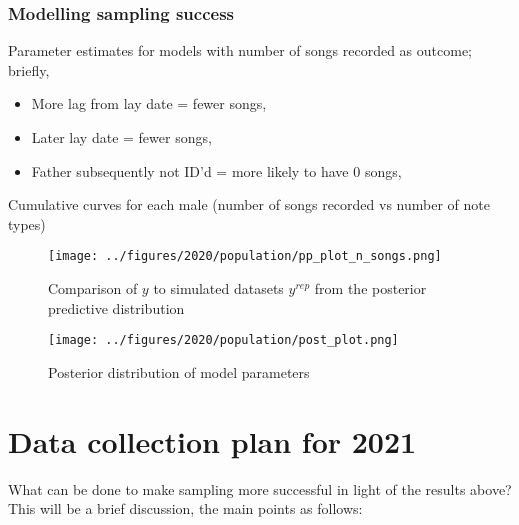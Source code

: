 \documentclass[]{report}
\begin{document}
\hypertarget{modelling-sampling-success}{%
\subsection{Modelling sampling
success}\label{modelling-sampling-success}}

Parameter estimates for models with number of songs recorded as outcome;
briefly,

\begin{itemize}
\item
  More lag from lay date = fewer songs,
\item
  Later lay date = fewer songs,
\item
  Father subsequently not ID'd = more likely to have 0 songs,
\end{itemize}

Cumulative curves for each male (number of songs recorded vs number of
note types)

\begin{figure}
\centering
\texttt{[image: ../figures/2020/population/pp\_plot\_n\_songs.png]}
\caption{Comparison of \(y\) to simulated datasets \(y^{rep}\) from the
posterior predictive distribution}
\end{figure}

\begin{figure}
\centering
\texttt{[image: ../figures/2020/population/post\_plot.png]}
\caption{Posterior distribution of model parameters}
\end{figure}

\hypertarget{data-collection-plan-for-2021}{%
\chapter{Data collection plan for
2021}\label{data-collection-plan-for-2021}}

What can be done to make sampling more successful in light of the
results above? This will be a brief discussion, the main points as
follows:
\end{document}
